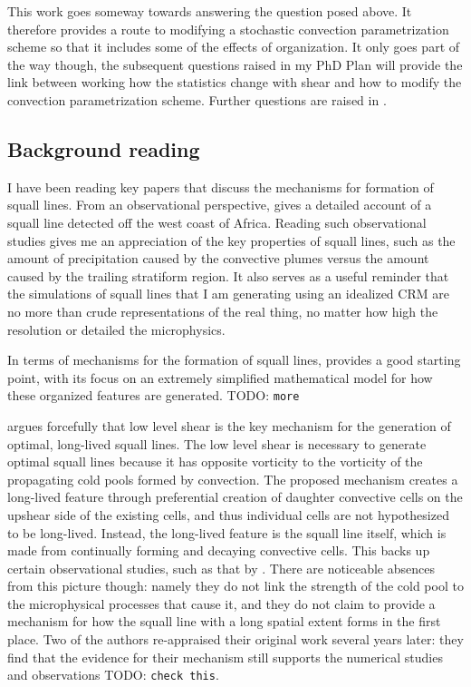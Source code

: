 \documentclass[11pt,a4paper]{article}
\newcommand{\todo}{TODO: \texttt}
\begin{document}
This work goes someway towards answering the question posed above. It therefore provides a route to modifying a stochastic convection parametrization scheme so that it includes some of the effects of organization. It only goes part of the way though, the subsequent questions raised in my PhD Plan will provide the link between working how the statistics change with shear and how to modify the convection parametrization scheme. Further questions are raised in \cite{muetz2017effects}. 

\subsection{Background reading}

I have been reading key papers that discuss the mechanisms for formation of squall lines. From an observational perspective, \cite{houze1977} gives a detailed account of a squall line detected off the west coast of Africa. Reading such observational studies gives me an appreciation of the key properties of squall lines, such as the amount of precipitation caused by the convective plumes versus the amount caused by the trailing stratiform region.  It also serves as a useful reminder that the simulations of squall lines that I am generating using an idealized CRM are no more than crude representations of the real thing, no matter how high the resolution or detailed the microphysics.

In terms of mechanisms for the formation of squall lines, \cite{TMM} provides a good starting point, with its focus on an extremely simplified mathematical model for how these organized features are generated. \todo{more}

\cite{RKW1988} argues forcefully that low level shear is the key mechanism for the generation of optimal, long-lived squall lines. The low level shear is necessary to generate optimal squall lines because it has opposite vorticity to the vorticity of the propagating cold pools formed by convection. The proposed mechanism creates a long-lived feature through preferential creation of daughter convective cells on the upshear side of the existing cells, and thus individual cells are not hypothesized to be long-lived. Instead, the long-lived feature is the squall line itself, which is made from continually forming and decaying convective cells. This backs up certain observational studies, such as that by \cite{houze}. There are noticeable absences from this picture though: namely they do not link the strength of the cold pool to the microphysical processes that cause it, and they do not claim to provide a mechanism for how the squall line with a long spatial extent forms in the first place. Two of the authors re-appraised their original work several years later: they find that the evidence for their mechanism still supports the numerical studies and observations \todo{check this}.
\end{document}
